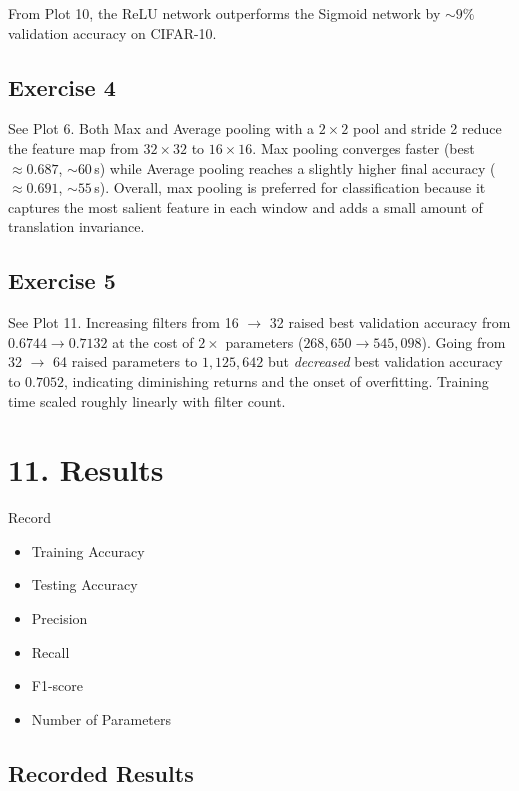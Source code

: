 \documentclass[11pt]{article}
\begin{document}
From Plot 10, the ReLU network outperforms the Sigmoid network by $\sim 9\%$ validation accuracy on CIFAR-10.

\subsection*{Exercise 4}

See Plot 6. Both Max and Average pooling with a $2\times2$ pool and
stride 2 reduce the feature map from $32\times32$ to $16\times16$. Max
pooling converges faster (best $\approx 0.687$, $\sim 60$\,s) while
Average pooling reaches a slightly higher final accuracy ($\approx
0.691$, $\sim 55$\,s). Overall, max pooling is preferred for
classification because it captures the most salient feature in each
window and adds a small amount of translation invariance.

\subsection*{Exercise 5}

See Plot 11. Increasing filters from 16 $\to$ 32 raised best validation accuracy from $0.6744 \to 0.7132$ at the cost of $2\times$ parameters ($268{,}650 \to 545{,}098$). Going from 32 $\to$ 64 raised parameters to $1{,}125{,}642$ but \emph{decreased} best validation accuracy to $0.7052$, indicating diminishing returns and the onset of overfitting. Training time scaled roughly linearly with filter count.

\section*{11. Results}

Record

\begin{itemize}
\item Training Accuracy
\item Testing Accuracy
\item Precision
\item Recall
\item F1-score
\item Number of Parameters
\end{itemize}

\subsection*{Recorded Results}
\end{document}
